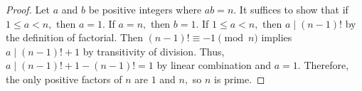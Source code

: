 \documentclass{ximera}
\begin{document}
\begin{proof}
    Let $a$ and $b$ be positive integers where $ab=n.$ It suffices to show that if $1\leq a < n,$ then $a=1.$ If $a=n,$ then $b=1.$ If  $1\leq a < n,$ then $a\mid (n-1)!$ by the definition of factorial. Then $(n-1)!\equiv -1\pmod{n}$ implies $a\mid (n-1)!+1$ by transitivity of division. Thus, $a\mid (n-1)!+1-(n-1)!=1$ by linear combination and $a=1.$ Therefore, the only positive factors of $n$ are $1$ and $n,$ so $n$ is prime.
\end{proof}





\end{document}
